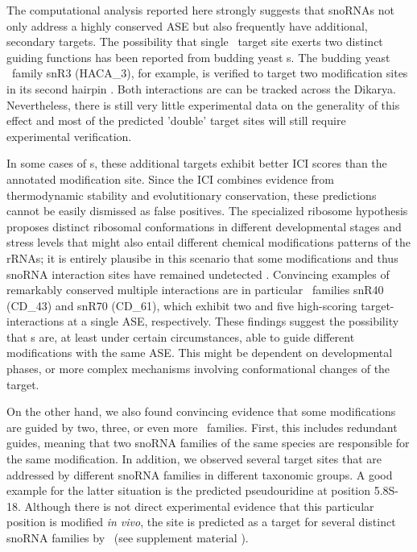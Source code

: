 The computational analysis reported here strongly suggests that snoRNAs not
only address a highly conserved ASE but also frequently have additional,
secondary targets. The possibility that single \sno\ target site exerts two
distinct guiding functions has been reported from budding yeast \haca
s. The budding yeast \sno\ family snR3 (HACA\_3), for example, is verified
to target two modification sites in its second hairpin \TODO{\cite{***}}.
Both interactions are can be tracked across the Dikarya.  Nevertheless,
there is still very little experimental data on the generality of this
effect and most of the predicted 'double' target sites will still require
experimental verification.


In some cases of \haca s, these additional targets exhibit better ICI
scores than the annotated modification site. Since the ICI combines
evidence from thermodynamic stability and evolutitionary conservation,
these predictions cannot be easily dismissed as false positives. The
specialized ribosome hypothesis proposes distinct ribosomal conformations
in different developmental stages and stress levels that might also entail
different chemical modifications patterns of the rRNAs; it is entirely
plausibe in this scenario that some modifications and thus snoRNA
interaction sites have remained undetected \citep{Xue:2012}.  Convincing
examples of remarkably conserved multiple interactions are in particular
\cd\ families snR40 (CD\_43) and snR70 (CD\_61), which exhibit two and five
high-scoring target-interactions at a single ASE, respectively.  These
findings suggest the possibility that \sno s are, at least under certain
circumstances, able to guide different modifications with the same
ASE. This might be dependent on developmental phases, or more complex
mechanisms involving conformational changes of the target.

On the other hand, we also found convincing evidence that some
modifications are guided by two, three, or even more \sno\ families. First,
this includes redundant guides, meaning that two snoRNA families of the
same species are responsible for the same modification. In addition, we
observed several target sites that are addressed by different snoRNA
families in different taxonomic groups. A good example for the latter
situation is the predicted pseudouridine at position 5.8S-18. Although
there is not direct experimental evidence that this particular position is
modified \emph{in vivo}, the site is predicted as a target for several
distinct snoRNA families by \snoop\ (see supplement material ).

